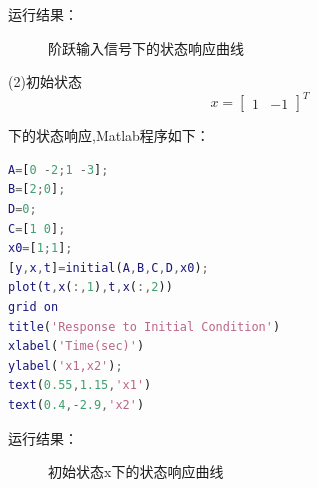 \documentclass[UTF8]{ctexart}
\begin{document}
\par 运行结果：
\newpage
\par \begin{figure}      
 \caption{\label{1} 阶跃输入信号下的状态响应曲线} 
 \end{figure}

\par (2)初始状态\[ x= \begin{bmatrix}1 & -1\end{bmatrix}^{T}\] \par 下的状态响应,Matlab程序如下：
\par  \begin{lstlisting}[language=matlab,escapeinside=``]
A=[0 -2;1 -3];
B=[2;0];
D=0;
C=[1 0];
x0=[1;1];
[y,x,t]=initial(A,B,C,D,x0);
plot(t,x(:,1),t,x(:,2))
grid on
title('Response to Initial Condition')
xlabel('Time(sec)')
ylabel('x1,x2');
text(0.55,1.15,'x1')
text(0.4,-2.9,'x2')
\end{lstlisting}

\par 运行结果：
\newpage
\par \begin{figure}      
 \caption{\label{1} 初始状态x下的状态响应曲线} 
 \end{figure}
\end{document}

